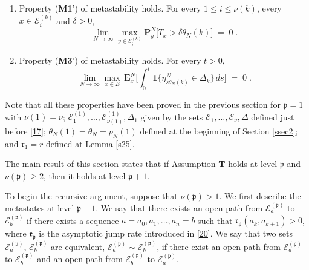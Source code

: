 \documentclass[reqno]{amsart}
\begin{document}
\begin{enumerate}
\item Property ({\bf M1}') of metastability holds. For every $1\le
  i\le \nu(k)$, every $x\in {{\mathcal E}}^{(k)}_i$ and $\delta>0$,
\begin{equation*}
\lim_{N\to \infty} \max_{y\in {{\mathcal E}}^{(k)}_i} {{\mathbf P}}^N_y \big[
T_{x} > \delta \theta_N(k) \big] \;=\; 0\;. 
\end{equation*}

\item Property ({\bf M3}') of metastability holds. For every $t>0$,
\begin{equation*}
\lim_{N\to \infty} \max_{x\in E} \, {{\mathbf E}}^N_x \Big[
\int_0^t {{\mathbf 1}}\{ \eta^N_{s\theta_N(k)} \in \Delta_k\} \, ds  \Big] \;=\; 0\;. 
\end{equation*}

\end{enumerate}
\smallskip

Note that all these properties have been proved in the previous
section for ${{\mathfrak p}}=1$ with $\nu(1) = \nu$; ${{\mathcal E}}^{(1)}_1, \dots, {{\mathcal E}}^{(1)}_{\nu(1)}, \Delta_1$ given by the sets ${{\mathcal E}}_1, \dots, {{\mathcal E}}_{\nu}, \Delta$ defined just before \eqref{17}; $\theta_N(1) =
\theta_N = p_N(1)$ defined at the beginning of Section \ref{ssec2};
and ${{\mathfrak r}}_1 = r$ defined at Lemma \ref{s25}. 

The main result of this section states that if Assumption {\bf T}
holds at level ${{\mathfrak p}}$ and $\nu({{\mathfrak p}})\ge 2$, then it holds at level
${{\mathfrak p}} +1$.

To begin the recursive argument, suppose that $\nu({{\mathfrak p}})>1$.  We
first describe the metastates at level ${{\mathfrak p}} + 1$. We say that there
exists an open path from ${{\mathcal E}}^{({{\mathfrak p}})}_a$ to ${{\mathcal E}}^{({{\mathfrak p}})}_b$ if
there exists a sequence $a=a_0 , a_1, \dots, a_n =b$ such that ${{\mathfrak r}}_{{{\mathfrak p}}}(a_k, a_{k+1})>0$, where ${{\mathfrak r}}_{{{\mathfrak p}}}$ is the asymptotic
jump rate introduced in \eqref{20}.  We say that two sets ${{\mathcal E}}^{({{\mathfrak p}})}_a$, ${{\mathcal E}}^{({{\mathfrak p}})}_b$ are equivalent, ${{\mathcal E}}^{({{\mathfrak p}})}_a \sim
{{\mathcal E}}^{({{\mathfrak p}})}_b$, if there exist an open path from ${{\mathcal E}}^{({{\mathfrak p}})}_a$ to ${{\mathcal E}}^{({{\mathfrak p}})}_b$ and an open path from ${{\mathcal E}}^{({{\mathfrak p}})}_b$ to ${{\mathcal E}}^{({{\mathfrak p}})}_a$.
\end{document}
